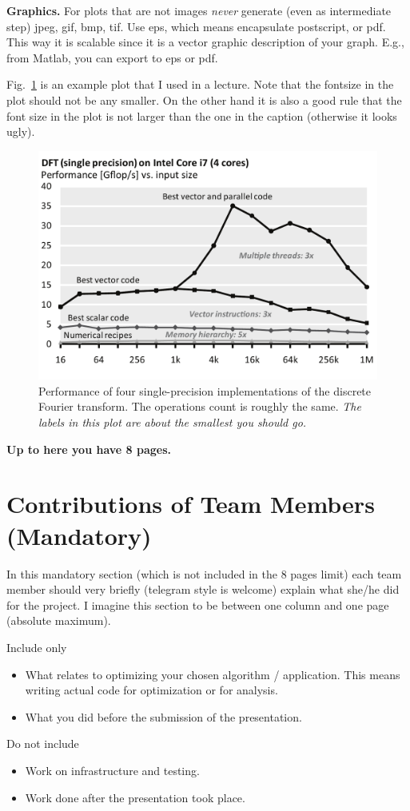 \documentclass[letterpaper]{article}
\newcommand{\mypar}[1]{{\bf #1.}}
\begin{document}
\mypar{Graphics} For plots that are not images {\em never} generate (even as intermediate step)
jpeg, gif, bmp, tif. Use eps, which means encapsulate postscript, or pdf. This way it is
scalable since it is a vector graphic description of your graph. E.g.,
from Matlab, you can export to eps or pdf.

Fig.~\ref{fftperf} is an example plot that I used in a lecture. Note that the fontsize in the plot should not be any smaller. On the other hand it is also a good rule that the font size in the plot is not larger than the one in the caption (otherwise it looks ugly).

\begin{figure}\centering
  \includegraphics[scale=0.33]{img/dft-performance.pdf}
  \caption{Performance of four single-precision implementations of the
  discrete Fourier transform. The operations count is roughly the
  same. {\em The labels in this plot are about the smallest you should go.}\label{fftperf}}
\end{figure}

\bigskip
{\bf Up to here you have 8 pages.}

\section{Contributions of Team Members (Mandatory)}

In this mandatory section (which is not included in the 8 pages limit) each team member should very briefly (telegram style is welcome) explain what she/he did for the project. I imagine this section to be between one column and one page (absolute maximum).

Include only 
\begin{itemize}
	\item What relates to optimizing your chosen algorithm / application. This means writing actual code for optimization or for analysis.
	\item What you did before the submission of the presentation.
\end{itemize}
Do not include
\begin{itemize}
	\item Work on infrastructure and testing.
	\item Work done after the presentation took place.
\end{itemize}
\end{document}
